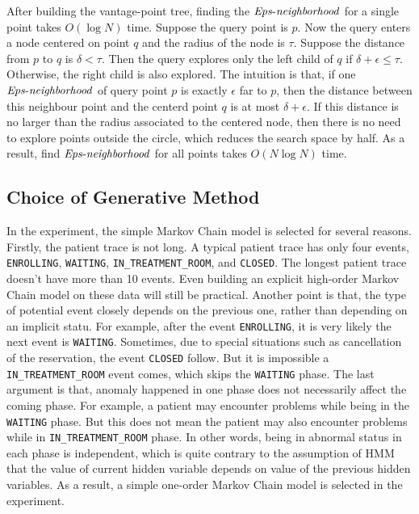After building the vantage-point tree, finding the $\id{Eps-neighborhood}$ for a single point takes $O(\log N)$ time. Suppose the query point is $p$. Now the query enters a node centered on point $q$ and the radius of the node is $\tau$. Suppose the distance from $p$ to $q$ is $\delta < \tau$. Then the query explores only the left child of $q$ if $\delta + \epsilon \leq \tau$. Otherwise, the right child is also explored. The intuition is that, if one $\id{Eps-neighborhood}$ of query point $p$ is exactly $\epsilon$ far to $p$, then the distance between this neighbour point and the centerd point $q$ is at most $\delta + \epsilon$. If this distance is no larger than the radius associated to the centered node, then there is no need to explore points outside the circle, which reduces the search space by half. As a result, find $\id{Eps-neighborhood}$ for all points takes $O(N \log N)$ time. 

\subsection{Choice of Generative Method}
In the experiment, the simple Markov Chain model is selected for several reasons. Firstly, the patient trace is not long. A typical patient trace has only four events, \texttt{ENROLLING}, \texttt{WAITING}, \texttt{IN\_TREATMENT\_ROOM}, and \texttt{CLOSED}. The longest patient trace doesn't have more than 10 events. Even building an explicit high-order Markov Chain model on these data will still be practical. Another point is that, the type of potential event closely depends on the previous one, rather than depending on an implicit statu. For example, after the event \texttt{ENROLLING}, it is very likely the next event is \texttt{WAITING}. Sometimes, due to special situations such as cancellation of the reservation, the event \texttt{CLOSED} follow. But it is impossible a \texttt{IN\_TREATMENT\_ROOM} event comes, which skips the \texttt{WAITING} phase. The last argument is that, anomaly happened in one phase does not necessarily affect the coming phase. For example, a patient may encounter problems while being in the \texttt{WAITING} phase. But this does not mean the patient may also encounter problems while in \texttt{IN\_TREATMENT\_ROOM} phase. In other words, being in abnormal status in each phase is independent, which is quite contrary to the assumption of HMM that the value of current hidden variable depends on value of the previous hidden variables. As a result, a simple one-order Markov Chain model is selected in the experiment.

